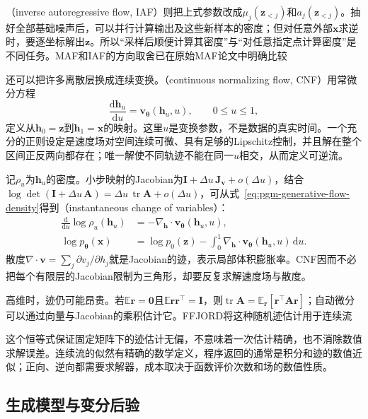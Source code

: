 （inverse autoregressive flow, IAF）则把上式参数改成$\mu_j(\bm{z}_{<j})$和$a_j(\bm{z}_{<j})$。抽好全部基础噪声后，可以并行计算输出及这些新样本的密度；但对任意外部$\bm{x}$求逆时，要逐坐标解出$\bm{z}$。所以“采样后顺便计算其密度”与“对任意指定点计算密度”是不同任务。MAF和IAF的方向取舍已在原始MAF论文中明确比较

还可以把许多离散层换成连续变换。（continuous normalizing flow, CNF）用常微分方程
\[
  \frac{\mathrm{d}\bm{h}_u}{\mathrm{d}u}
    =\bm{v}_{\bm{\theta}}(\bm{h}_u,u),
  \qquad 0\leq u\leq1,
\]
定义从$\bm{h}_0=\bm{z}$到$\bm{h}_1=\bm{x}$的映射。这里$u$是变换参数，不是数据的真实时间。一个充分的正则设定是速度场对空间连续可微、具有足够的Lipschitz控制，并且解在整个区间正反两向都存在；唯一解使不同轨迹不能在同一$u$相交，从而定义可逆流。

记$\rho_u$为$\bm{h}_u$的密度。小步映射的Jacobian为$\bm{I}+\Delta u\,\bm{J}_{\bm{v}}+o(\Delta u)$，结合$\log\det(\bm{I}+\Delta u\,\bm{A})=\Delta u\,\operatorname{tr}\bm{A}+o(\Delta u)$，可从式~\eqref{eq:pgm-generative-flow-density}得到（instantaneous change of variables）：
\begin{equation}
  \label{eq:pgm-generative-instantaneous-change}
  \begin{aligned}
    \frac{\mathrm{d}}{\mathrm{d}u}
         \log\rho_u(\bm{h}_u)
       &=-\nabla_{\bm{h}}\!\cdot
          \bm{v}_{\bm{\theta}}(\bm{h}_u,u),\\
    \log p_{\bm{\theta}}(\bm{x})
       &=\log p_0(\bm{z})
         -\int_0^1\nabla_{\bm{h}}\!\cdot
           \bm{v}_{\bm{\theta}}(\bm{h}_u,u)\,\mathrm{d}u.
  \end{aligned}
\end{equation}
散度$\nabla\cdot\bm{v}=\sum_j\partial v_j/\partial h_j$就是Jacobian的迹，表示局部体积膨胀率。CNF因而不必把每个有限层的Jacobian限制为三角形，却要反复求解速度场与散度。

高维时，迹仍可能昂贵。若$\mathbb{E}\bm{r}=\bm{0}$且$\mathbb{E}\bm{r}\bm{r}^{\top}=\bm{I}$，则$\operatorname{tr}\bm{A}=\mathbb{E}_{\bm{r}}[\bm{r}^{\top}\bm{A}\bm{r}]$；自动微分可以通过向量与Jacobian的乘积估计它。FFJORD将这种随机迹估计用于连续流

这个恒等式保证固定矩阵下的迹估计无偏，不意味着一次估计精确，也不消除数值求解误差。连续流的似然有精确的数学定义，程序返回的通常是积分和迹的数值近似；正向、逆向都需要求解器，成本取决于函数评价次数和场的数值性质。

\subsection{生成模型与变分后验}
\label{sec:pgm-generative-flow-roles}

